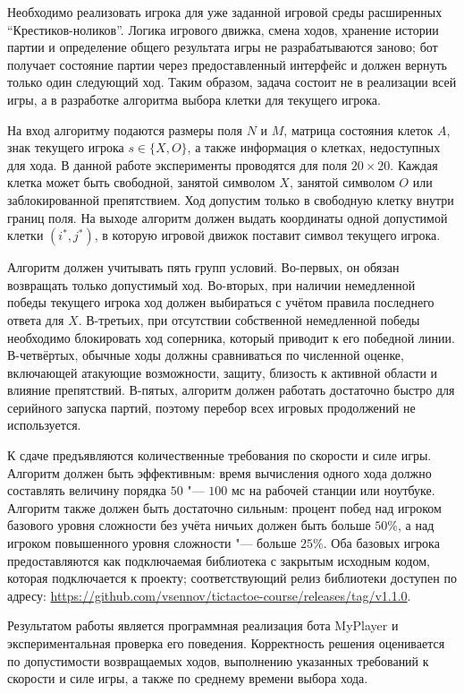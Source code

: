 \documentclass[a4paper,14pt]{extarticle}
\begin{document}
Необходимо реализовать игрока для уже заданной игровой среды расширенных “Крестиков-ноликов”. Логика игрового движка, смена ходов, хранение истории партии и определение общего результата игры не разрабатываются заново; бот получает состояние партии через предоставленный интерфейс и должен вернуть только один следующий ход. Таким образом, задача состоит не в реализации всей игры, а в разработке алгоритма выбора клетки для текущего игрока.

На вход алгоритму подаются размеры поля $N$ и $M$, матрица состояния клеток $A$, знак текущего игрока $s \in \{X,O\}$, а также информация о клетках, недоступных для хода. В данной работе эксперименты проводятся для поля $20 \times 20$. Каждая клетка может быть свободной, занятой символом $X$, занятой символом $O$ или заблокированной препятствием. Ход допустим только в свободную клетку внутри границ поля. На выходе алгоритм должен выдать координаты одной допустимой клетки $(i^*,j^*)$, в которую игровой движок поставит символ текущего игрока.

Алгоритм должен учитывать пять групп условий. Во-первых, он обязан возвращать только допустимый ход. Во-вторых, при наличии немедленной победы текущего игрока ход должен выбираться с учётом правила последнего ответа для $X$. В-третьих, при отсутствии собственной немедленной победы необходимо блокировать ход соперника, который приводит к его победной линии. В-четвёртых, обычные ходы должны сравниваться по численной оценке, включающей атакующие возможности, защиту, близость к активной области и влияние препятствий. В-пятых, алгоритм должен работать достаточно быстро для серийного запуска партий, поэтому перебор всех игровых продолжений не используется.

К сдаче предъявляются количественные требования по скорости и силе игры. Алгоритм должен быть эффективным: время вычисления одного хода должно составлять величину порядка $50$ "--- $100$ мс на рабочей станции или ноутбуке. Алгоритм также должен быть достаточно сильным: процент побед над игроком базового уровня сложности без учёта ничьих должен быть больше $50\%$, а над игроком повышенного уровня сложности "--- больше $25\%$. Оба базовых игрока предоставляются как подключаемая библиотека с закрытым исходным кодом, которая подключается к проекту; соответствующий релиз библиотеки доступен по адресу: \url{https://github.com/vsennov/tictactoe-course/releases/tag/v1.1.0}.

Результатом работы является программная реализация бота MyPlayer и экспериментальная проверка его поведения. Корректность решения оценивается по допустимости возвращаемых ходов, выполнению указанных требований к скорости и силе игры, а также по среднему времени выбора хода.
\end{document}
